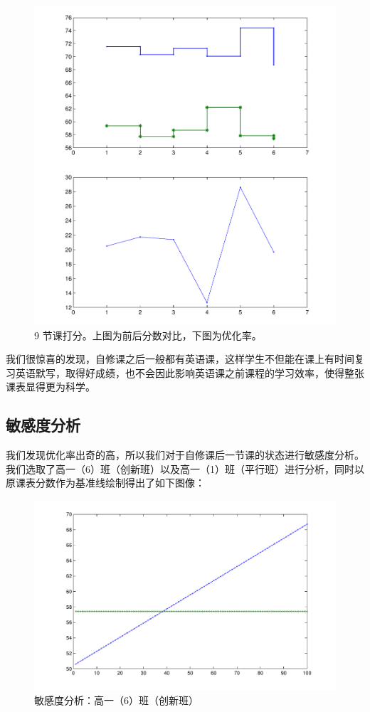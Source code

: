 \documentclass[a4paper]{article}
\begin{document}
  \begin{figure}[H]
  \centerline{\includegraphics[scale=0.7]{9lessons.pdf}}
  \caption{9 节课打分。上图为前后分数对比，下图为优化率。}
  \end{figure}

  我们很惊喜的发现，自修课之后一般都有英语课，这样学生不但能在课上有时间复习英语默写，取得好成绩，也不会因此影响英语课之前课程的学习效率，使得整张课表显得更为科学。

 \subsection{敏感度分析}

  我们发现优化率出奇的高，所以我们对于自修课后一节课的状态进行敏感度分析。我们选取了高一（6）班（创新班）以及高一（1）班（平行班）进行分析，同时以原课表分数作为基准线绘制得出了如下图像：

  \begin{figure}[H]
  \centerline{\includegraphics[scale=0.5]{seninno.pdf}}
  \caption{敏感度分析：高一（6）班（创新班）}
  \end{figure}
\end{document}

